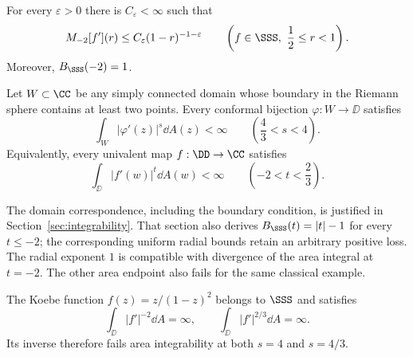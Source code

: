 \begin{theorem}
\label{thm:main}
For every $\varepsilon>0$ there is $C_\varepsilon<\infty$ such that
\begin{equation}\label{eq:main-uniform}
 M_{-2}[f'](r)\le C_\varepsilon(1-r)^{-1-\varepsilon}
 \qquad\left(f\in\SSS,\ \frac12\le r<1\right).
\end{equation}
Moreover, $B_{\SSS}(-2)=1$.

Let $W\subset\CC$ be any simply connected domain whose boundary in
the Riemann sphere contains at least two points. Every conformal
bijection $\varphi:W\to\DD$ satisfies
\[
 \int_W|\varphi'(z)|^s\dd A(z)<\infty
 \qquad\left(\frac43<s<4\right).
\]
Equivalently, every univalent map $f:\DD\to\CC$ satisfies
\[
 \int_{\DD}|f'(w)|^t\dd A(w)<\infty
 \qquad\left(-2<t<\frac23\right).
\]
\end{theorem}

The domain correspondence, including the boundary condition, is
justified in Section~\ref{sec:integrability}. That section also derives
$B_{\SSS}(t)=|t|-1$ for every $t\le-2$; the corresponding uniform
radial bounds retain an arbitrary positive loss. The radial exponent $1$
is compatible with divergence of the area integral at $t=-2$.
The other area endpoint also fails for the same classical example.

\begin{corollary}\label{cor:sharp-endpoints}
The Koebe function $f(z)=z/(1-z)^2$ belongs to $\SSS$ and satisfies
\[
 \int_{\DD}|f'|^{-2}\dd A=\infty,
 \qquad
 \int_{\DD}|f'|^{2/3}\dd A=\infty.
\]
Its inverse therefore fails area integrability at both $s=4$ and $s=4/3$.
\end{corollary}

